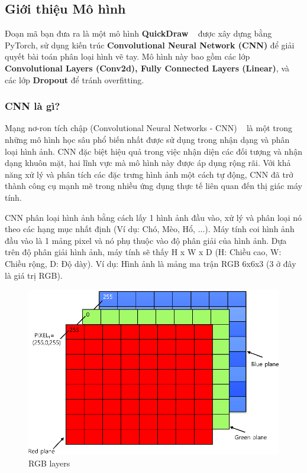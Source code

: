 \subsection{Giới thiệu Mô hình}

Đoạn mã bạn đưa ra là một mô hình \textbf{QuickDraw} ~\cite{kaggle} được xây dựng bằng PyTorch, sử dụng kiến trúc \textbf{Convolutional Neural Network (CNN)} để giải quyết bài toán phân loại hình vẽ tay. Mô hình này bao gồm các lớp \textbf{Convolutional Layers (Conv2d), Fully Connected Layers (Linear)}, và các lớp \textbf{Dropout} để tránh overfitting.

\subsubsection{CNN là gì?}

Mạng nơ-ron tích chập (Convolutional Neural Networks - CNN) ~\cite{CNN}  là một trong những mô hình học sâu phổ biến nhất được sử dụng trong nhận dạng và phân loại hình ảnh. CNN đặc biệt hiệu quả trong việc nhận diện các đối tượng và nhận dạng khuôn mặt, hai lĩnh vực mà mô hình này được áp dụng rộng rãi. Với khả năng xử lý và phân tích các đặc trưng hình ảnh một cách tự động, CNN đã trở thành công cụ mạnh mẽ trong nhiều ứng dụng thực tế liên quan đến thị giác máy tính.

CNN phân loại hình ảnh bằng cách lấy 1 hình ảnh đầu vào, xử lý và phân loại nó theo các hạng mục nhất định (Ví dụ: Chó, Mèo, Hổ, ...). Máy tính coi hình ảnh đầu vào là 1 mảng pixel và nó phụ thuộc vào độ phân giải của hình ảnh. Dựa trên độ phân giải hình ảnh, máy tính sẽ thấy H x W x D (H: Chiều cao, W: Chiều rộng, D: Độ dày). Ví dụ: Hình ảnh là mảng ma trận RGB 6x6x3 (3 ở đây là giá trị RGB).

\begin{figure}[H]  %
    \centering
    \includegraphics[width=0.75\linewidth]{Chapter2/RGB.png}
    \caption{RGB layers}
    \label{fig:baitoan}
\end{figure}

